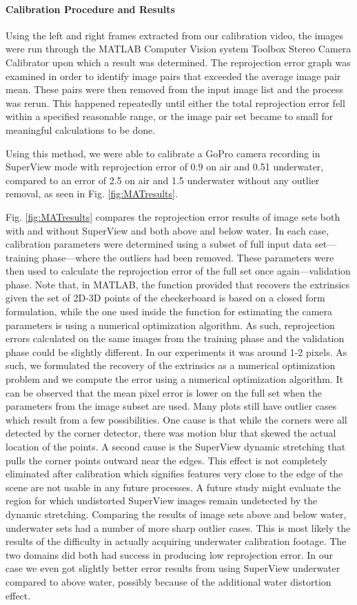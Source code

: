 \paragraph*{Calibration Procedure and Results}Using the left and right frames extracted from our calibration video, the images were run through the MATLAB Computer Vision system Toolbox Stereo Camera Calibrator upon which a result was determined. The reprojection error graph was examined in order to identify image pairs that exceeded the average image pair mean. These pairs were then removed from the input image list and the process was rerun. This happened repeatedly until either the total reprojection error fell within a specified reasonable range, or the image pair set became to small for meaningful calculations to be done. 

Using this method, we were able to calibrate a GoPro camera recording in SuperView mode with reprojection error of 0.9 on air and 0.51 underwater, compared to an error of 2.5 on air and 1.5 underwater without any outlier removal, as seen in Fig. \ref{fig:MATresults}.

Fig. \ref{fig:MATresults} compares the reprojection error results of image sets both with and without SuperView and both above and below water. 
In each case, calibration parameters were determined using a subset of full input data set---training phase---where the outliers had been removed. These parameters were then used to calculate the reprojection error of the full set once again---validation phase. 
Note that, in MATLAB, the function provided that recovers the extrinsics given the set of 2D-3D points of the checkerboard is based on a closed form formulation, while the one used inside the function for estimating the camera parameters is using a numerical optimization algorithm. As such, reprojection errors calculated on the same images from the training phase and the validation phase could be slightly different. In our experiments it was around 1-2 pixels. As such, we formulated the recovery of the extrinsics as a numerical optimization problem and we compute the error using a numerical optimization algorithm.
It can be observed that the mean pixel error is lower on the full set when the parameters from the image subset are used. Many plots still have outlier cases which result from a few possibilities. One cause is that while the corners were all detected by the corner detector, there was motion blur that skewed the actual location of the points. A second cause is the SuperView dynamic stretching that pulls the corner points outward near the edges. This effect is not completely eliminated after calibration which signifies features very close to the edge of the scene are not usable in any future processes. A future study might evaluate the region for which undistorted SuperView images remain undetected by the dynamic stretching. Comparing the results of image sets above and below water, underwater sets had a number of more sharp outlier cases. This is most likely the results of the difficulty in actually acquiring underwater calibration footage. The two domains did both had success in producing low reprojection error. In our case we even got slightly better error results from using SuperView underwater compared to above water, possibly because of the additional water distortion effect.